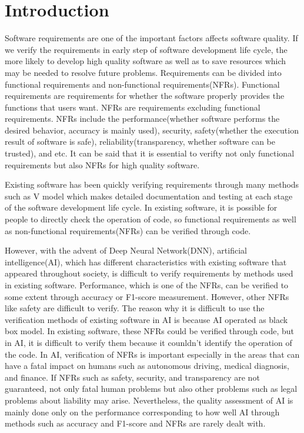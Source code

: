 \documentclass[journal,article,submit,moreauthors,pdftex]{Definitions/mdpi}
\begin{document}
\section{Introduction}

Software requirements are one of the important factors affects software quality.
If we verify the requirements in early step of software development life cycle, the more likely to develop high quality software as well as to save resources which may be needed to resolve future problems.
Requirements can be divided into functional requirements and non-functional requirements(NFRs).
Functional requirements are requirements for whether the software properly provides the functions that users want.
NFRs are requirements excluding functional requirements. NFRs include the performance(whether software performs the desired behavior, accuracy is mainly used), security\cite{security-mei,security-mei2,security-barreno}, safety(whether the execution result of software is safe)\cite{safety-amodei}, reliability(transparency, whether software can be trusted)\cite{transparency-yosinski}, and etc. %
It can be said that it is essential to verifty not only functional requirements but also NFRs for high quality software.

Existing software has been quickly verifying requirements through many methods such as V model which makes detailed documentation and testing at each stage of the software development life cycle.
In existing software, it is possible for people to directly check the operation of code, so functional requirements as well as non-functional requirements(NFRs) can be verified through code.

However, with the advent of Deep Neural Network(DNN), artificial intelligence(AI), which has different characteristics with existing software that appeared throughout society, is difficult to verify requirements by methods used in existing software.
Performance, which is one of the NFRs, can be verified to some extent through accuracy or F1-score measurement. However, other NFRs like safety are difficult to verify.
The reason why it is difficult to use the verification methods of existing software in AI is because AI operated as black box model. In existing software, these NFRs could be verified through code, but in AI, it is difficult to verify them because it counldn't identify the operation of the code.
In AI, verification of NFRs is important especially in the areas that can have a fatal impact on humans such as autonomous driving, medical diagnosis, and finance.
If NFRs such as safety, security, and transparency are not guaranteed, not only fatal human problems but also other problems such as legal problems about liability may arise.
Nevertheless, the quality assessment of AI is mainly done only on the performance corresponding to how well AI through methods such as accuracy and F1-score and NFRs are rarely dealt with.
\end{document}
